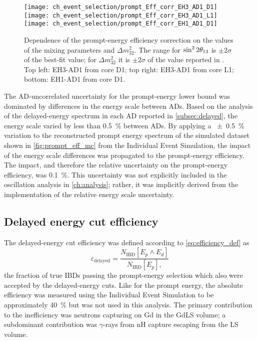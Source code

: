 \begin{figure}
    \centering
    \texttt{[image: ch\_event\_selection/prompt\_Eff\_corr\_EH3\_AD1\_D1]}
    \texttt{[image: ch\_event\_selection/prompt\_Eff\_corr\_EH3\_AD1\_L1]}
    \\
    \texttt{[image: ch\_event\_selection/prompt\_Eff\_corr\_EH1\_AD1\_D1]}
    \caption[Prompt efficiency correction contour maps]{
        Dependence of the prompt-energy efficiency correction
        on the values of the mixing parameters \thetaot{} and $\Delta m^2_{32}$.
        The range for $\sin^22\theta_{13}{}$ is $\pm2\sigma$ of the best-fit value;
        for $\Delta m^2_{32}$ it is $\pm2\sigma$ of the value reported in \cite{ngd2018}.
        Top left: EH3-AD1 from core D1;
        top right: EH3-AD1 from core L1;
        bottom: EH1-AD1 from core D1.
    }
    \label{fig:prompt_eff_osc_contour}
\end{figure}

The AD-uncorrelated uncertainty for the prompt-energy lower bound
was dominated by differences in the energy scale between ADs.
Based on the analysis of the delayed-energy spectrum in each AD
reported in \cref{subsec:delayed}, the energy scale
varied by less than \SI{0.5}{\percent} between ADs.
By applying a \SI{+-0.5}{\percent} variation to
the reconstructed prompt energy spectrum of the simulated dataset
shown in \cref{fig:prompt_eff_mc} from the Individual Event Simulation,
the impact of the energy scale differences was propagated
to the prompt-energy efficiency.
The impact, and therefore the relative uncertainty on
the prompt-energy efficiency, was \SI{0.1}{\percent}.
This uncertainty was not explicitly included in the
oscillation analysis in \cref{ch:analysis};
rather, it was implicitly derived from the
implementation of the relative energy scale uncertainty.

\subsection{Delayed energy cut efficiency}
\label{subsec:eff_delayed}

The delayed-energy cut efficiency was defined according to \cref{eq:efficiency_def} as
\begin{equation}\label{eq:delayed_eff}
    \varepsilon_\text{delayed} = \frac{N_\text{IBD}[E_p \wedge E_d]}{
        N_\text{IBD}[E_p],
    }
\end{equation}
the fraction of true IBDs passing the prompt-energy selection
which also were accepted by the delayed-energy cuts.
Like for the prompt energy, the absolute efficiency
was measured using the Individual Event Simulation to be approximately \SI{40}{\percent}
but was not used in this analysis.
The primary contribution to the inefficiency
was neutrons capturing on Gd in the GdLS volume;
a subdominant contribution was $\gamma$-rays from nH capture escaping from the LS volume.

